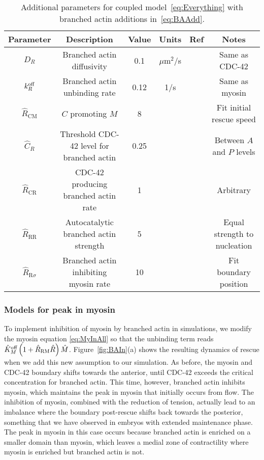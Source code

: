 \documentclass[11pt]{article}
\newcommand{\6}[1]{#1_{\text{6}}}
\newcommand{\3}[1]{#1_{\text{3}}}
\begin{document}
\begin{table}
\begin{small}
\centering
\begin{tabular}{|c|c|c|c|c|c|}\hline
Parameter & Description & Value & Units & Ref & Notes \\ \hline
$D_R$ & Branched actin diffusivity & 0.1 & $\mu$m$^2$/s & & Same as CDC-42 \\
$k^\text{off}_R$ & Branched actin unbinding rate & 0.12 & 1/s & & Same as myosin \\ \hline
$\hat R_\text{CM}$ & $C$ promoting $M$ & 8 & &  & Fit initial rescue speed\\ 
$\hat C_R$ & Threshold CDC-42 level for branched actin & 0.25 & & & Between $A$ and $P$ levels\\
$\hat R_\text{CR}$ & CDC-42 producing branched actin rate  & 1 & & & Arbitrary\\ 
$\hat R_\text{RR}$ & Autocatalytic branched actin strength  & 5 & & & Equal strength to nucleation\\ 
$\hat R_\text{R$\sigma$}$ & Branched actin inhibiting myosin rate & 10 & & & Fit boundary position\\  \hline
\end{tabular}
\caption{\label{tab:paramsBR} Additional parameters for coupled model\ \eqref{eq:Everything} with branched actin additions in\ \eqref{eq:BAAdd}.}
\end{small}
\end{table}


\subsubsection{Models for peak in myosin}
To implement inhibition of myosin by branched actin in simulations, we modify the myosin equation \eqref{eq:MyInAll} so that the unbinding term reads $\hat{K}^\text{off}_M \left( 1+\hat R_\text{RM} \hat R\right) \hat M$. Figure\ \ref{fig:BAIn}(a) shows the resulting dynamics of rescue when we add this new assumption to our simulation. As before, the myosin and CDC-42 boundary shifts towards the anterior, until CDC-42 exceeds the critical concentration for branched actin. This time, however, branched actin inhibits myosin, which maintains the peak in myosin that initially occurs from flow. The inhibition of myosin, combined with the reduction of tension, actually lead to an imbalance where the boundary post-rescue shifts back towards the posterior, something that we have observed in embryos with extended maintenance phase. The peak in myosin in this case occurs because branched actin is enriched on a smaller domain than myosin, which leaves a medial zone of contractility where myosin is enriched but branched actin is not.
\end{document}
